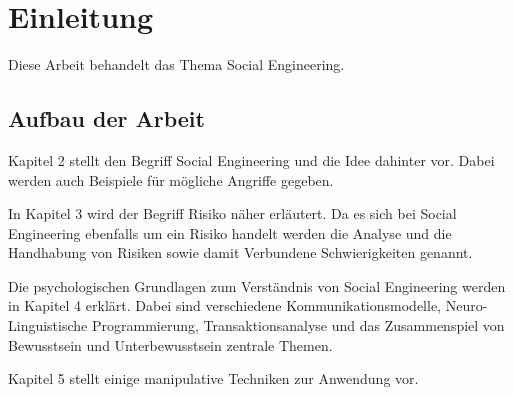 \section{Einleitung}\label{2_kap1}
Diese Arbeit behandelt das Thema Social Engineering.

\subsection{Aufbau der Arbeit}
Kapitel 2 stellt den Begriff Social Engineering und die Idee dahinter vor. Dabei werden auch Beispiele für mögliche Angriffe gegeben.

In Kapitel 3 wird der Begriff Risiko näher erläutert. Da es sich bei Social Engineering ebenfalls um ein Risiko handelt werden die Analyse und die Handhabung von Risiken sowie damit Verbundene Schwierigkeiten genannt.

Die psychologischen Grundlagen zum Verständnis von Social Engineering werden in Kapitel 4 erklärt. Dabei sind verschiedene Kommunikationsmodelle, Neuro-Linguistische Programmierung, Transaktionsanalyse und das Zusammenspiel von Bewusstsein und Unterbewusstsein zentrale Themen.

Kapitel 5 stellt einige manipulative Techniken zur Anwendung vor.